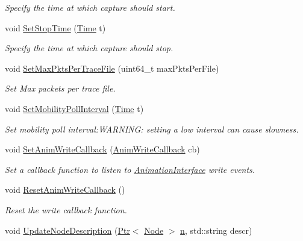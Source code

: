 \begin{DoxyCompactItemize}
\begin{DoxyCompactList}\small\item\em Specify the time at which capture should start. \end{DoxyCompactList}\item 
void \hyperlink{classns3_1_1AnimationInterface_aa12d5f852a182f528c7336703b451e89}{Set\+Stop\+Time} (\hyperlink{classns3_1_1Time}{Time} t)
\begin{DoxyCompactList}\small\item\em Specify the time at which capture should stop. \end{DoxyCompactList}\item 
void \hyperlink{classns3_1_1AnimationInterface_a5f35af18c95d79a2bb97ea03f3135f5b}{Set\+Max\+Pkts\+Per\+Trace\+File} (uint64\+\_\+t max\+Pkts\+Per\+File)
\begin{DoxyCompactList}\small\item\em Set Max packets per trace file. \end{DoxyCompactList}\item 
void \hyperlink{classns3_1_1AnimationInterface_a0b8a43eecc40e9da62abaf8b5f898551}{Set\+Mobility\+Poll\+Interval} (\hyperlink{classns3_1_1Time}{Time} t)
\begin{DoxyCompactList}\small\item\em Set mobility poll interval\+:\+W\+A\+R\+N\+I\+NG\+: setting a low interval can cause slowness. \end{DoxyCompactList}\item 
void \hyperlink{classns3_1_1AnimationInterface_af846864b1b50aefe00dd4820b20a8ff2}{Set\+Anim\+Write\+Callback} (\hyperlink{classns3_1_1AnimationInterface_a91003c61e43e2d6cb6192a55d3d69796}{Anim\+Write\+Callback} cb)
\begin{DoxyCompactList}\small\item\em Set a callback function to listen to \hyperlink{classns3_1_1AnimationInterface}{Animation\+Interface} write events. \end{DoxyCompactList}\item 
void \hyperlink{classns3_1_1AnimationInterface_aa8b2a29ca7065ed85455f5ee04a83460}{Reset\+Anim\+Write\+Callback} ()
\begin{DoxyCompactList}\small\item\em Reset the write callback function. \end{DoxyCompactList}\item 
void \hyperlink{classns3_1_1AnimationInterface_adaad6891a737119ff48304aed442fedd}{Update\+Node\+Description} (\hyperlink{classns3_1_1Ptr}{Ptr}$<$ \hyperlink{classns3_1_1Node}{Node} $>$ \hyperlink{lte__link__budget__x2__handover__measures_8m_abdb05bc5a064cf642a06c83b3392f148}{n}, std\+::string descr)

\end{DoxyCompactItemize}
